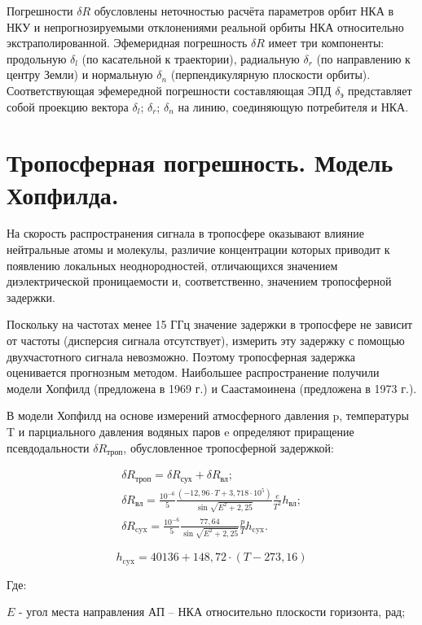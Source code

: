 \documentclass[14pt,a4paper,oneside]{extarticle}
\begin{document}
Погрешности $\delta R$ обусловлены неточностью расчёта параметров орбит НКА в НКУ и непрогнозируемыми отклонениями реальной орбиты НКА относительно экстраполированной. Эфемеридная погрешность $\delta R$ имеет три компоненты: продольную $\delta_{l}$ (по касательной к траектории), радиальную $\delta_{r}$ (по направлению к центру Земли) и нормальную $\delta_{n}$ (перпендикулярную плоскости орбиты). Соответствующая эфемередной погрешности составляющая ЭПД $\delta_{\text{э}}$ представляет собой проекцию вектора {$\delta_{l}$; $\delta_{r}$; $\delta_{n}$} на линию, соединяющую потребителя и НКА.

\section{Тропосферная погрешность. Модель Хопфилда.}

На скорость распространения сигнала в тропосфере оказывают влияние нейтральные атомы и молекулы, различие концентрации которых приводит к появлению локальных неоднородностей, отличающихся значением диэлектрической проницаемости и, соответственно, значением тропосферной задержки.

Поскольку на частотах менее 15 ГГц значение задержки в тропосфере не зависит от частоты (дисперсия сигнала отсутствует), измерить эту задержку с помощью двухчастотного сигнала невозможно. Поэтому тропосферная задержка оценивается прогнозным методом. Наибольшее распространение получили модели Хопфилд (предложена в 1969 г.) и Саастамоинена (предложена в 1973 г.).

В модели Хопфилд на основе измерений атмосферного давления p, температуры T и парциального давления водяных паров e определяют приращение псевдодальности $\delta R_{\text{троп}}$, обусловленное тропосферной задержкой:

\[\begin{gathered}
        \delta R_{\text{троп}}=\delta R_{\text{сух}}+\delta R_{\text{вл}}; \\
        {\delta}R_{\text{вл}}=\frac{10^{-6}}{5}\frac{(-12,96\cdot T+3,718\cdot10^{5})}{\sin\sqrt{E^{2}+2,25}}\frac{e}{T^{2}}h_{\text{вл}}; \\
        \delta R_{\text{cyx}}=\frac{10^{-6}}{5}\frac{77,64}{\sin\sqrt{E^{2}+2,25}}\frac{p}{T}h_{\text{cyx}}.
    \end{gathered}\]

    \[h_{\mathrm{cyx}}=40136+148,72\cdot(T-273,16)\]

Где:

$E$ - угол места направления АП – НКА относительно плоскости горизонта, рад;
\end{document}
